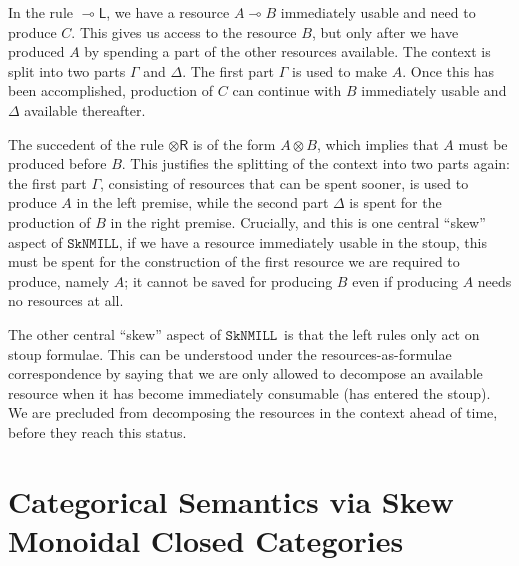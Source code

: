 \documentclass[copyright,creativecommons]{eptcs}
\theoremstyle{definition}
\newcommand{\tr}{\otimes \mathsf{R}}
\newcommand{\lleft}{{\multimap}\mathsf{L}}
\newcommand{\ot}{\otimes}
\newcommand{\lolli}{\multimap}
\newcommand{\SkNMILL}{$\mathtt{SkNMILL}$}
\newcommand{\niccolo}[1]{{\color{red}\textbf{Niccol{\`o}: }#1}}
\begin{document}
In the rule $\lleft$, we have a resource $A
\lolli B$ immediately usable and need to produce $C$. This gives us
access to the resource $B$, but only after we have produced $A$ by spending a part of the other resources available.  The context is split into two parts $\Gamma$ and $\Delta$. The first part $\Gamma$ is used to make $A$. Once this has been accomplished, production of $C$ can continue with $B$ immediately usable and $\Delta$ available thereafter.

The succedent of the rule $\tr$ is of the form $A \ot B$, which
implies that $A$ must be produced before $B$. This justifies the
splitting of the context into two parts again: the first part $\Gamma$, consisting of
resources that can be spent sooner, is used to produce $A$ in the left
premise, while the second part $\Delta$ is spent for the production of $B$ in the
right premise. Crucially, and this is one central ``skew'' aspect
of \SkNMILL, if we have a resource immediately usable in the
stoup, this must be spent for the construction of the first resource
we are required to produce, namely $A$; it cannot be saved for producing $B$ even if producing $A$ needs no resources at all.

The other central ``skew'' aspect of \SkNMILL\ is that the left
rules only act on stoup formulae. This can be understood under the
resources-as-formulae correspondence by saying that we are only allowed to
decompose an available resource when it has become immediately consumable (has entered the stoup). We are precluded from decomposing the
resources in the context ahead of time, before they reach this status. 



\section{Categorical Semantics via Skew Monoidal Closed Categories}
\label{sec:catsem}

\end{document}
